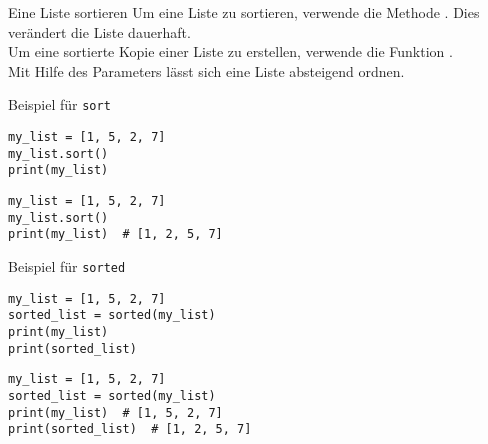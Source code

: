 \begin{fragile}
	
\begin{block}{Eine Liste sortieren}
\vspace{2pt}
Um eine Liste zu sortieren, verwende die Methode . Dies verändert die Liste dauerhaft. \\
\pause 
Um eine sortierte Kopie einer Liste zu erstellen, verwende die Funktion .  \\
\pause 
Mit Hilfe des Parameters  lässt sich eine Liste absteigend ordnen. 
\end{block}	

\pause \vspace{12pt}

\begin{exampleblock}{Beispiel für \texttt{sort}}
\vspace{2pt}
\begin{overprint}
\begin{verbatim}
my_list = [1, 5, 2, 7]
my_list.sort()
print(my_list)  
\end{verbatim}
\begin{verbatim}
my_list = [1, 5, 2, 7]
my_list.sort()
print(my_list)  # [1, 2, 5, 7]
\end{verbatim}
\end{overprint}

\end{exampleblock}

\vspace{12pt}

\pause \pause 

\begin{exampleblock}{Beispiel für \texttt{sorted}}
\vspace{2pt}
\begin{overprint}
\begin{verbatim}
my_list = [1, 5, 2, 7]
sorted_list = sorted(my_list)
print(my_list)  
print(sorted_list)  
\end{verbatim}
\begin{verbatim}
my_list = [1, 5, 2, 7]
sorted_list = sorted(my_list)
print(my_list)  # [1, 5, 2, 7]
print(sorted_list)  # [1, 2, 5, 7]
\end{verbatim}
\end{overprint}
\end{exampleblock}
\end{fragile}


